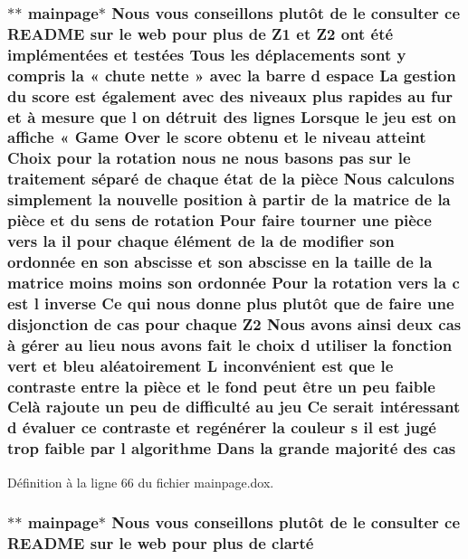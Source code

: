 \hypertarget{mainpage_8dox_a28d908e91a20ecb016d27b941f85907c}{
\subsubsection[{cas}]{\setlength{\rightskip}{0pt plus 5cm}$\ast$$\ast$ mainpage$\ast$ Nous vous conseillons plutô{\bf t} {\bf de} le consulter ce R\-E\-A\-D\-M\-E sur le web pour plus {\bf de} {\bf Z1} et Z2 ont é{\bf t}é implémentées et testées Tous les déplacements sont {\bf y} compris la « chute nette » avec la barre d espace La gestion du score est également avec des niveaux plus rapides au fur et à mesure que l on détruit des lignes Lorsque le jeu est on affiche « Game Over le score obtenu et le niveau atteint Choix pour la rotation nous ne nous basons pas sur le traitement {\bf s}éparé {\bf de} chaque état {\bf de} la pièce Nous calculons simplement la nouvelle position à partir {\bf de} la {\bf matrice} {\bf de} la pièce et du {\bf sens} {\bf de} rotation Pour faire tourner une pièce vers la il pour chaque élément {\bf de} la {\bf de} modifier son ordonnée en son abscisse et son abscisse en la taille {\bf de} la {\bf matrice} moins moins son ordonnée Pour la rotation vers la {\bf c} est l inverse Ce qui nous donne plus plutô{\bf t} que {\bf de} faire une disjonction {\bf de} cas pour chaque Z2 Nous avons ainsi deux cas à {\bf g}érer au lieu nous avons fait le choix d utiliser la fonction vert et bleu aléatoirement L inconvénient est que le contraste entre la pièce et le fond peut être un peu faible Celà rajoute un peu {\bf de} difficulté au jeu Ce serait intéressant d évaluer ce contraste et regé{\bf n}érer la couleur {\bf s} il est jugé trop faible par l algorithme Dans la grande majorité des cas}}\label{mainpage_8dox_a28d908e91a20ecb016d27b941f85907c}


Définition à la ligne 66 du fichier mainpage.\-dox.

\hypertarget{mainpage_8dox_aaa7d01b20e9495683b5080988ab310f6}{
\subsubsection[{clarté}]{\setlength{\rightskip}{0pt plus 5cm}$\ast$$\ast$ mainpage$\ast$ Nous vous conseillons plutô{\bf t} {\bf de} le consulter ce R\-E\-A\-D\-M\-E sur le web pour plus {\bf de} clarté}}\label{mainpage_8dox_aaa7d01b20e9495683b5080988ab310f6}



